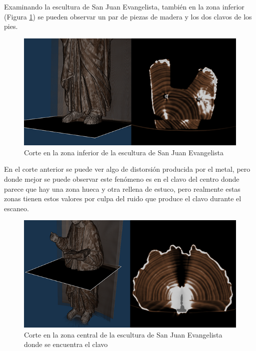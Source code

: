 Examinando la escultura de San Juan Evangelista, también en la zona inferior (Figura \ref{fig:corte_san_juan_evangelista_clavos_pies}) se pueden observar un par de piezas de madera y los dos clavos de los pies.

\begin{figure}[H]
	\centering
	\includegraphics[width=12.5cm]{imagenes/corte_san_juan_evangelista_clavos_pies}
	\caption{Corte en la zona inferior de la escultura de San Juan Evangelista}
	\label{fig:corte_san_juan_evangelista_clavos_pies}
\end{figure}

En el corte anterior se puede ver algo de distorsión producida por el metal, pero donde mejor se puede observar este fenómeno es en el clavo del centro donde parece que hay una zona hueca y otra rellena de estuco, pero realmente estas zonas tienen estos valores por culpa del ruido que produce el clavo durante el escaneo.

\begin{figure}[H]
	\centering
	\includegraphics[width=12.5cm]{imagenes/corte_san_juan_evangelista_clavo}
	\caption{Corte en la zona central de la escultura de San Juan Evangelista donde se encuentra el clavo}
	\label{fig:corte_san_juan_evangelista_clavo}
\end{figure}


